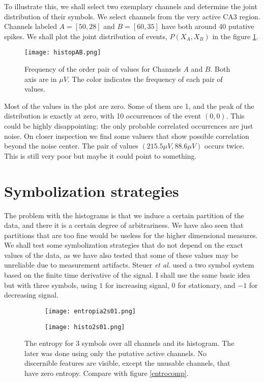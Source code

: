 \documentclass[10pt]{article}
\begin{document}
To illustrate this, we shall select two exemplary channels and
determine the joint distribution of their symbols. We select channels from
the very active CA3 region. Channels labeled $A=[50,28]$ and $B=[60,35]$ have both
around 40 putative spikes. We shall plot the joint distribution of events,
$P(X_A, X_B)$ in the figure \ref{histopAB}.

\begin{figure}
  \begin{center}
    \texttt{[image: histopAB.png]}
  \end{center}
  \caption{Frequency of the order pair of values for Channels $A$ and $B$.
    Both axis are in $\mu V$.  The color indicates the frequency of each pair
  of values.}
  \label{histopAB}
\end{figure}

Most of the values in the plot are zero. Some of them are 1, and the peak of
the distribution is exactly at zero, with 10 occurrences of the event $(0,0)$.
This could be highly disappointing: the only probable correlated occurrences are
just noise. On closer inspection we find some valuers that show possible correlation
beyond the noise center. The pair of values $(215.5 \mu V, 88.6 \mu V)$ occurs twice.
This is still very poor but maybe it could point to something. 


\section{Symbolization strategies}

The problem with the histograms is that we induce a certain partition of the
data, and there it is a certain degree of arbitrariness. We have also seen
that partitions that are too fine would be useless for the higher dimensional
measures. We shall test some symbolization strategies that do not depend
on the exact values of the data, as we have also tested that some of these
values may be unreliable due to measurement artifacts.
Steuer \emph{et al.} \cite{Steuer2004} used a two symbol system based on
the finite time derivative of the signal. I shall use the same basic idea
but with three symbols, using $1$ for increasing signal, $0$ for stationary, and
$-1$ for decreasing signal.

\begin{figure}
  \centering
  \begin{subfigure}[b]{0.49\textwidth}
    \texttt{[image: entropia2s01.png]}
  \end{subfigure}
   \begin{subfigure}[b]{0.49\textwidth}
    \texttt{[image: histo2s01.png]}
  \end{subfigure}
   \caption{The entropy for 3 symbols over all channels  and its histogram. The later was done using only the putative active channels. No discernible features are visible,
     except the unusable channels, that have zero entropy. Compare with figure
     \ref{entrocomp}. }
   \label{entro2s01}
\end{figure}
\end{document}
